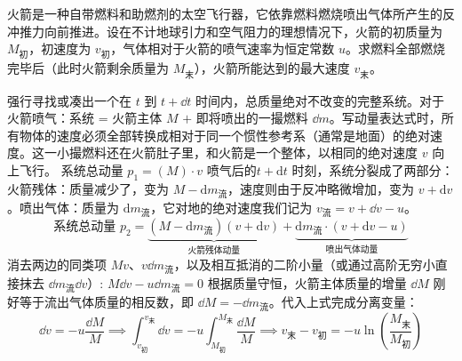 \begin{example}
火箭是一种自带燃料和助燃剂的太空飞行器，它依靠燃料燃烧喷出气体所产生的反冲推力向前推进。设在不计地球引力和空气阻力的理想情况下，火箭的初质量为 $M_{\text{初}}$，初速度为 $v_{\text{初}}$，气体相对于火箭的喷气速率为恒定常数 $u$。求燃料全部燃烧完毕后（此时火箭剩余质量为 $M_{\text{末}}$），火箭所能达到的最大速度 $v_{\text{末}}$。
\end{example}
\begin{solution}
强行寻找或凑出一个在 $t$ 到 $t+\dd t$ 时间内，总质量绝对不改变的完整系统。对于火箭喷气：系统 = 火箭主体 $M$ $+$ 即将喷出的一撮燃料 $\dd m$。写动量表达式时，所有物体的速度必须全部转换成相对于同一个惯性参考系（通常是地面）的绝对速度。这一小撮燃料还在火箭肚子里，和火箭是一个整体，以相同的绝对速度 $v$ 向上飞行。 \(\text{系统总动量 } p_1 = (M) \cdot v\) 
喷气后的$t+\mathrm{d}t$ 时刻，系统分裂成了两部分：火箭残体：质量减少了，变为 $M - \mathrm{d}m_{\text{流}}$，速度则由于反冲略微增加，变为 $v + \mathrm{d}v$。喷出气体：质量为 $\mathrm{d}m_{\text{流}}$，它对地的绝对速度我们记为 $v_{\text{流}}=v+\dd v-u$。
$$\text{系统总动量 } p_2 = \underbrace{(M - \mathrm{d}m_{\text{流}})(v + \mathrm{d}v)}_{\text{火箭残体动量}} + \underbrace{\mathrm{d}m_{\text{流}} \cdot (v+\mathrm{d} v-u)}_{\text{喷出气体动量}}$$
消去两边的同类项 $Mv$、$v\dd m_{\text{流}}$，以及相互抵消的二阶小量（或通过高阶无穷小直接抹去 $\dd m_{\text{流}}\dd v$）:
 \(M\dd v - u\dd m_{\text{流}} = 0\) 根据质量守恒，火箭主体质量的增量 $\dd M$ 刚好等于流出气体质量的相反数，即 $\dd M = -\dd m_{\text{流}}$。代入上式完成分离变量：
\[
\dd v = -u\frac{\dd M}{M}\implies
\int_{v_{\text{初}}}^{v_{\text{末}}} \dd v = -u \int_{M_{\text{初}}}^{M_{\text{末}}} \frac{\dd M}{M} \implies v_{\text{末}} - v_{\text{初}} = -u \ln\left(\frac{M_{\text{末}}}{M_{\text{初}}}\right)
\]
\end{solution}

